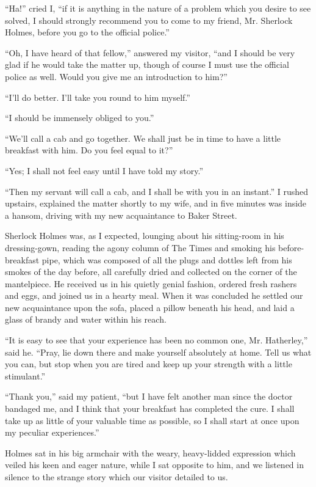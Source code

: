 \documentclass{article}
\begin{document}
``Ha!'' cried I, ``if it is anything in the nature of a problem which
you desire to see solved, I should strongly recommend you to come to my
friend, Mr. Sherlock Holmes, before you go to the official police.''

``Oh, I have heard of that fellow,'' answered my visitor, ``and I should
be very glad if he would take the matter up, though of course I must use
the official police as well. Would you give me an introduction to him?''

``I'll do better. I'll take you round to him myself.''

``I should be immensely obliged to you.''

``We'll call a cab and go together. We shall just be in time to have a
little breakfast with him. Do you feel equal to it?''

``Yes; I shall not feel easy until I have told my story.''

``Then my servant will call a cab, and I shall be with you in an
instant.'' I rushed upstairs, explained the matter shortly to my wife,
and in five minutes was inside a hansom, driving with my new acquaintance
to Baker Street.

Sherlock Holmes was, as I expected, lounging about his sitting-room in
his dressing-gown, reading the agony column of The Times and smoking
his before-breakfast pipe, which was composed of all the plugs and
dottles left from his smokes of the day before, all carefully dried
and collected on the corner of the mantelpiece. He received us in his
quietly genial fashion, ordered fresh rashers and eggs, and joined us
in a hearty meal. When it was concluded he settled our new acquaintance
upon the sofa, placed a pillow beneath his head, and laid a glass of
brandy and water within his reach.

``It is easy to see that your experience has been no common one,
Mr. Hatherley,'' said he. ``Pray, lie down there and make yourself
absolutely at home. Tell us what you can, but stop when you are tired
and keep up your strength with a little stimulant.''

``Thank you,'' said my patient, ``but I have felt another man since
the doctor bandaged me, and I think that your breakfast has completed
the cure. I shall take up as little of your valuable time as possible,
so I shall start at once upon my peculiar experiences.''

Holmes sat in his big armchair with the weary, heavy-lidded expression
which veiled his keen and eager nature, while I sat opposite to him, and
we listened in silence to the strange story which our visitor detailed
to us.
\end{document}
